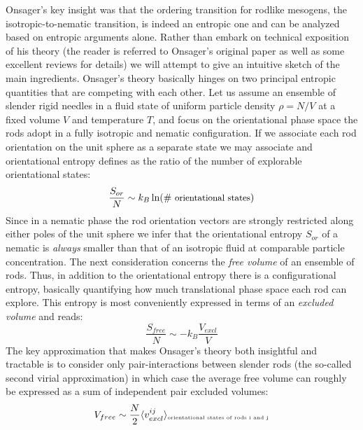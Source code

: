\documentclass[amssymb]{revtex4}
\begin{document}
Onsager's key insight was that the ordering transition for rodlike mesogens, the isotropic-to-nematic transition, is indeed an entropic one and can be analyzed based on entropic arguments alone. Rather than embark on technical exposition of his theory (the reader is referred to Onsager's original paper \cite{onsager} as well as some excellent reviews \cite{vroege92,allenevans} for details) we will attempt to give an intuitive sketch of the main ingredients.  Onsager's theory basically hinges on two principal entropic quantities that are competing with each other.   Let us assume an ensemble of slender rigid needles in a fluid state of uniform particle density $\rho = N/V$ at a fixed volume $V$ and temperature $T$, and focus on the orientational phase space the rods adopt in a fully isotropic and nematic configuration. If we associate each rod orientation on the unit sphere as a separate state we may associate and orientational entropy defines as the ratio of the number of explorable orientational states:  
\begin{equation}
\frac{S_{or}}{N} \sim k_{B} \ln ( \mbox{\# {\small orientational states}})
\label{sor}
\end{equation}
Since in a nematic phase the rod orientation vectors are strongly restricted along either poles of the unit sphere we infer that the orientational entropy $S_{or}$ of a nematic is {\em always} smaller than that of an isotropic fluid at comparable particle concentration. The next consideration concerns the {\em free volume} of an ensemble of rods. Thus, in addition to the orientational entropy there is a configurational entropy, basically quantifying how much translational phase space each rod can explore. This entropy is most conveniently expressed in terms of an {\em excluded volume} and reads:
\begin{equation}
\frac{S_{free}}{N} \sim -k_{B} \frac{V_{excl}}{V}
\label{strans}
\end{equation}
The key approximation that makes Onsager's theory both insightful and tractable is to consider only pair-interactions between slender rods (the so-called second virial approximation) in which case the average free volume can roughly be expressed as a sum of independent pair excluded volumes: 
\begin{equation}
V_{free} \sim \frac{N}{2} \langle v^{ij}_{excl} \rangle_{\mbox{\tiny orientational states of rods i and j}} 
\end{equation}
\end{document}

